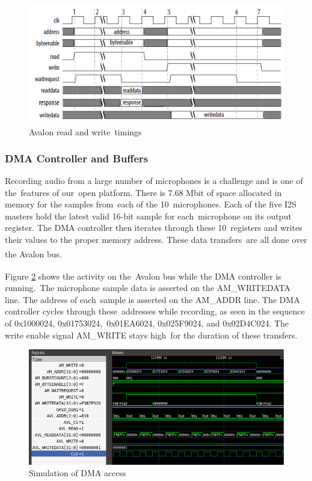 \documentclass{article}
\begin{document}
\begin{figure}[ht]
	\includegraphics[scale=.5]{pictures/avalon.png}
	\centering

	\caption{Avalon\textsuperscript{\textregistered{}} read and write\
	timings \cite{avalon}}

	\label{avalon}
\end{figure}


\subsubsection{DMA Controller and Buffers}
Recording audio from a large number of microphones is a challenge and is one of the\
features of our\
open platform. There is 7.68 Mbit of space allocated in memory for the samples from\
each of the 10\
microphones. Each of the five I2S masters hold the latest valid 16-bit sample for each\
microphone on its output register. The DMA controller then iterates through these 10\
registers and writes their values to the proper memory address.  These data transfers\
are all done over the Avalon\textsuperscript{\textregistered{}} bus. \

Figure \ref{dma_sim} shows the activity on the\
Avalon\textsuperscript{\textregistered{}} bus while the DMA controller is running.\
The microphone sample data is asserted on the AM\_WRITEDATA line.  The address of each\
sample is asserted on the AM\_ADDR line.  The DMA controller cycles through these\
addresses while recording, as seen in the sequence of 0x1000024, 0x01753024,\
0x01EA6024, 0x025F9024, and 0x02D4C024. The write enable signal AM\_WRITE stays high\
for the duration of these transfers.

\begin{figure}[ht]
	\begin{center}
	\includegraphics[scale=.38]{pictures/sim_close.png}
	\caption{Simulation of DMA access}
	\label{dma_sim}
	\end{center}
\end{figure}
\end{document}
